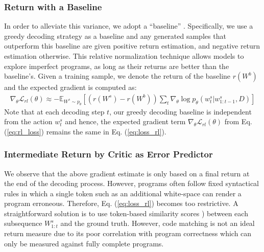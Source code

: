 \documentclass{article}
\begin{document}
\subsubsection{Return with a Baseline}
In order to alleviate this variance, we adopt a ``baseline'' \citep{sutton2018reinforcement}. 
Specifically, we use a greedy decoding strategy as a baseline and any generated samples that outperform this baseline are given positive return estimation, and negative return estimation otherwise. 
This relative normalization technique allows models to explore imperfect programs, as long as their returns are better than the baseline's.
Given a training sample, we denote the return of the baseline $r(W^b)$ and 
the expected gradient is computed as: 
\begin{align}
    \nabla_\theta \mathcal{L}_{rl}(\theta) \approx -\mathbb{E}_{W^s \sim p_\theta} [(r(W^s)-r(W^b))  \sum_t \nabla_\theta \log p_\theta(w^s_t|w^s_{1:t-1}, D)]
    \label{eq:loss_rl}
\end{align}
Note that at each decoding step $t$, our greedy decoding baseline is independent from the action $w^s_t$ and hence, the expected gradient term $\nabla_\theta \mathcal{L}_{rl}(\theta)$ from Eq. (\ref{eq:rl_loss}) remains the same in Eq. (\ref{eq:loss_rl}).



\subsubsection{Intermediate Return by Critic as Error Predictor}
We observe that the above gradient estimate is only based on a final return at the end of the decoding process. 
However, programs often follow fixed syntactical rules in which a single token such as an additional white-space can render a program erroneous. 
Therefore, Eq. (\ref{eq:loss_rl}) becomes too restrictive. 
A straightforward solution is to use token-based similarity scores \citep{papineni2002bleu, ren2020codebleu}) between each subsequence $W^s_{1:t}$ and the ground truth. 
However, code matching is not an ideal return measure due to its poor correlation with program correctness \citep{hendrycksapps2021, chen2021evaluating, austin2021program} which can only be measured against fully complete programs. 
\end{document}
